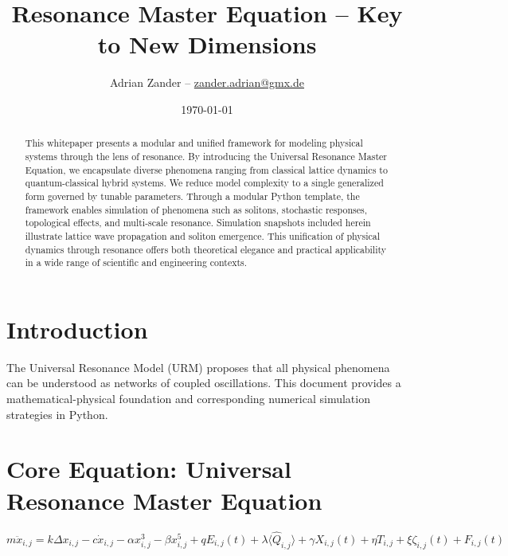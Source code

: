 \documentclass[12pt]{article}
\title{\textbf{Resonance Master Equation -- Key to New Dimensions}}
\author{Adrian Zander -- \href{mailto:zander.adrian@gmx.de}{zander.adrian@gmx.de}}
\date{\today}
\begin{document}
\maketitle

\begin{abstract}
\begin{sloppypar}
This whitepaper presents a modular and unified framework for modeling physical systems through the lens of resonance. By introducing the Universal Resonance Master Equation, we encapsulate diverse phenomena ranging from classical lattice dynamics to quantum-classical hybrid systems. We reduce model complexity to a single generalized form governed by tunable parameters. Through a modular Python template, the framework enables simulation of phenomena such as solitons, stochastic responses, topological effects, and multi-scale resonance. Simulation snapshots included herein illustrate lattice wave propagation and soliton emergence. This unification of physical dynamics through resonance offers both theoretical elegance and practical applicability in a wide range of scientific and engineering contexts.
\end{sloppypar}
\end{abstract}

\clearpage

\section*{Introduction}
The Universal Resonance Model (URM) proposes that all physical phenomena can be understood as networks of coupled oscillations. This document provides a mathematical-physical foundation and corresponding numerical simulation strategies in Python.

\section*{Core Equation: Universal Resonance Master Equation}
\begin{dmath}
m \ddot{x}_{i,j} = k \Delta x_{i,j} - c \dot{x}_{i,j} - \alpha x_{i,j}^3 - \beta x_{i,j}^5 + q E_{i,j}(t) + \lambda \langle \hat{Q}_{i,j} \rangle + \gamma X_{i,j}(t) + \eta T_{i,j} + \xi \zeta_{i,j}(t) + F_{i,j}(t)
\end{dmath}
\end{document}
